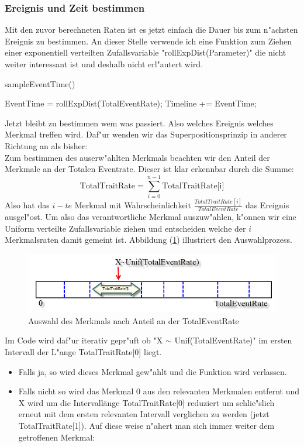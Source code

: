 \documentclass[11pt, a4paper, german]{article}
\theoremstyle{plain}
\begin{document}
	\subsubsection{Ereignis und Zeit bestimmen}
	
	Mit den zuvor berechneten Raten ist es jetzt einfach die Dauer bis zum n"achsten Ereignis zu bestimmen. An dieser Stelle verwende ich eine Funktion zum Ziehen einer exponentiell verteilten Zufallsvariable "{}rollExpDist(Parameter)"{} die nicht weiter interessant ist und deshalb nicht erl"autert wird.
 	\begin{algorithm}[H]
 		\caption{sampleEventTime()}
 		\begin{algorithmic}[1]
 			\STATE EventTime = rollExpDist(TotalEventRate);
 			\STATE Timeline += EventTime;
 		\end{algorithmic}
 	\end{algorithm}
 	Jetzt bleibt zu bestimmen wem was passiert. Also welches Ereignis welches Merkmal treffen wird. Daf"ur wenden wir das Superpositionsprinzip in anderer Richtung an als bisher:\\
 	Zum bestimmen des auserw"ahlten Merkmals beachten wir den Anteil der Merkmale an der Totalen Eventrate. Dieser ist klar erkennbar durch die Summe:
 	\[ \text{TotalTraitRate} = \sum_{i = 0}^{n - 1} \text{TotalTraitRate[i]} \]
 	Also hat das $ i-te $ Merkmal mit Wahrscheinlichkeit $ \frac{TotalTraitRate[i]}{TotalEventRate} $ das Ereignis ausgel"ost. Um also das verantwortliche Merkmal auszuw"ahlen, k"onnen wir eine Uniform verteilte Zufallsvariable ziehen und entscheiden welche der $ i $ Merkmalsraten damit gemeint ist. Abbildung (\ref{SelectTrait}) illustriert den Auswahlprozess.
 	\begin{figure}[H]
		\centering
		\includegraphics[width=1\linewidth]{./Pictures/SelectTrait}
		\caption[]{Auswahl des Merkmals nach Anteil an der TotalEventRate}
		\label{SelectTrait}
	\end{figure}
	Im Code wird daf"ur iterativ gepr"uft ob "{}X $ \sim $ Unif(TotalEventRate)"{} im ersten Intervall der L"ange TotalTraitRate[0] liegt. 
	\begin{itemize}
		\item[] Falls ja, so wird dieses Merkmal gew"ahlt und die Funktion wird verlassen.
		\item[] Falls nicht so wird das Merkmal $ 0 $ aus den relevanten Merkmalen entfernt und X wird um die Intervallänge TotalTraitRate[0] reduziert um schlie"slich erneut mit dem ersten relevanten Intervall verglichen zu werden (jetzt TotalTraitRate[1]). Auf diese weise n"ahert man sich immer weiter dem getroffenen Merkmal:
	\end{itemize}
\end{document}
